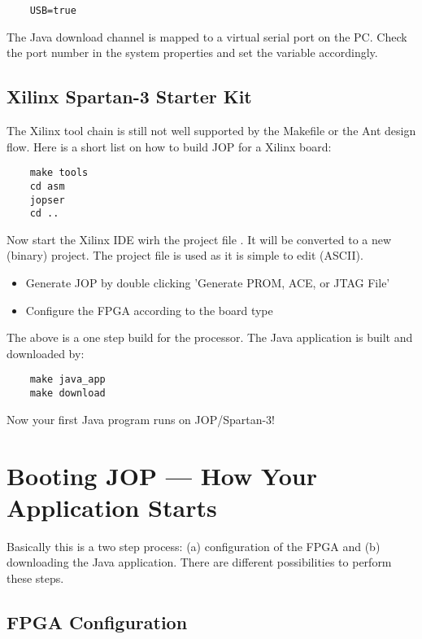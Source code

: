 \begin{verbatim}
    USB=true
\end{verbatim}

The Java download channel is mapped to a virtual serial port on the
PC. Check the port number in the system properties and set the
variable  accordingly.

\subsection{Xilinx Spartan-3 Starter Kit}

 The Xilinx tool chain is still not well supported by
the Makefile or the Ant design flow. Here is a short list on how to
build JOP for a Xilinx board:

\begin{verbatim}
    make tools
    cd asm
    jopser
    cd ..
\end{verbatim}


Now start the Xilinx IDE wirh the project file . It
will be converted to a new (binary)  project. The
 project file is used as it is simple to edit (ASCII).

\begin{itemize}
    \item Generate JOP by double clicking 'Generate PROM, ACE, or JTAG File'
    \item Configure the FPGA according to the board type
\end{itemize}

The above is a one step build for the processor. The Java
application is built and downloaded by:

\begin{verbatim}
    make java_app
    make download
\end{verbatim}

Now your first Java program runs on JOP/Spartan-3!

\section{Booting JOP --- How Your Application Starts}

Basically this is a two step process: (a) configuration of the FPGA
and (b) downloading the Java application. There are different
possibilities to perform these steps.

\subsection{FPGA Configuration}

